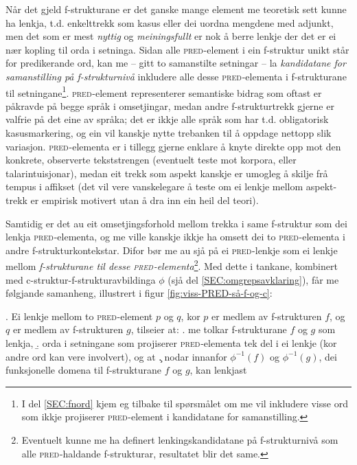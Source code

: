 \documentclass[12pt,a4paper,oneside,draft]{report}
\newcommand{\F}[2]{\textsc{#1}\ensuremath{_{#2}}}
\newcommand{\PRED}{\F{pred}{}}
\begin{document}
Når det gjeld f\hyp{}strukturane er det ganske mange element me
 teoretisk sett kunne ha lenkja, t.d. enkelttrekk som kasus eller dei
 uordna mengdene med adjunkt, men det som er mest \emph{nyttig} og
 \emph{meiningsfullt} er nok å berre lenkje der det er ei nær kopling til
 orda i setninga. Sidan alle \PRED{}-element i ein f\hyp{}struktur
 unikt står for predikerande ord, kan me -- gitt to samanstilte
 setningar -- la \emph{kandidatane for samanstilling på
 f\hyp{}strukturnivå} inkludere alle desse \PRED{}-elementa i
 f\hyp{}strukturane til setningane\footnote{I del \ref{SEC:fnord} kjem eg tilbake til spørsmålet om me vil
        inkludere visse ord som ikkje projiserer \PRED{}-element i
        kandidatane for samanstilling. }. \PRED{}-element
 representerer semantiske bidrag som oftast er påkravde på begge språk
 i omsetjingar, medan andre f\hyp{}strukturtrekk gjerne er valfrie på
 det eine av språka; det er ikkje alle språk som har t.d. obligatorisk
 kasusmarkering, og ein vil kanskje nytte trebanken til å oppdage
 nettopp slik variasjon.  \PRED{}-elementa er i tillegg gjerne enklare
 å knyte direkte opp mot den konkrete, observerte tekststrengen
 (eventuelt teste mot korpora, eller talarintuisjonar), medan eit
 trekk som aspekt kanskje er umogleg å skilje frå tempus i affikset
 (det vil vere vanskelegare å teste om ei lenkje mellom aspekt-trekk
 er empirisk motivert utan å dra inn ein heil del teori).

Samtidig er det au eit omsetjingsforhold mellom trekka i same
f\hyp{}struktur som dei lenkja \PRED{}-elementa, og me ville kanskje ikkje ha
omsett dei to \PRED{}-elementa i andre f\hyp{}strukturkontekstar. Difor bør me
au sjå på ei \PRED{}-lenkje som ei lenkje mellom \emph{f\hyp{}strukturane til
desse \PRED{}-elementa}\footnote{Eventuelt kunne me ha definert lenkingskandidatane på
       f\hyp{}strukturnivå som alle \PRED{}-haldande f\hyp{}strukturar, resultatet
       blir det same. }.  Med dette i tankane, kombinert med
c\hyp{}struktur-f\hyp{}strukturavbildinga $\phi$ (sjå del
\ref{SEC:omgrepsavklaring}), får me følgjande samanheng, illustrert i
figur \ref{fig:viss-PRED-så-f-og-c}:

\ex. \label{krav:f-links} Ei lenkje mellom to \PRED{}-element $p$ og $q$, kor
      $p$ er medlem av f\hyp{}strukturen $f$, og $q$ er medlem av
      f\hyp{}strukturen $g$, tilseier at:
\a. \label{krav:f-links-substr} me tolkar f\hyp{}strukturane $f$ og $g$ som lenkja,
\b. \label{krav:f-links-words} orda i setningane som projiserer
     \PRED{}-elementa tek del i ei lenkje (kor andre
     ord kan vere involvert), og at
\c. \label{krav:f-links-domain} nodar innanfor $\phi^{-1}(f)$
     og $\phi^{-1}(g)$, dei funksjonelle domena til f\hyp{}strukturane $f$
     og $g$, kan lenkjast
\end{document}
